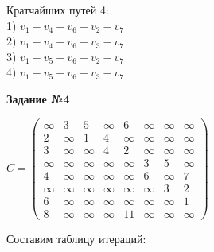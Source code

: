 \documentclass{article}
\begin{document}
\hspace*{8mm} Кратчайших путей 4:
\\
\hspace*{12mm} 1) $v_1 - v_4 - v_6 - v_2 - v_7$
\\
\hspace*{12mm} 2) $v_1 - v_4 - v_6 - v_3 - v_7$
\\
\hspace*{12mm} 3) $v_1 - v_5 - v_6 - v_2 - v_7$
\\
\hspace*{12mm} 4) $v_1 - v_5 - v_6 - v_3 - v_7$
\newpage
\begin{center}
	\textbf{Задание №4}
\end{center}
\hspace{10mm}$C = 
\begin{pmatrix}
	\infty & 3 & 5 & \infty & 6 & \infty & \infty & \infty \\
	2 & \infty & 1 & 4 & \infty & \infty & \infty & \infty \\
	3 & \infty & \infty & 4 & 2 & \infty & \infty & \infty \\
	\infty & \infty & \infty & \infty & \infty & 3 & 5 & \infty \\
	4 & \infty & \infty & \infty & \infty & 6 & \infty & 7 \\
	\infty & \infty & \infty & \infty & \infty & \infty & 3 & 2 \\
	6 & \infty & \infty & \infty & \infty & \infty & \infty & 1 \\
	8 & \infty & \infty & \infty & 11 & \infty & \infty & \infty
\end{pmatrix}$
\vspace{5mm}
\par
\hspace{2mm}
Составим таблицу итераций:
\end{document}
